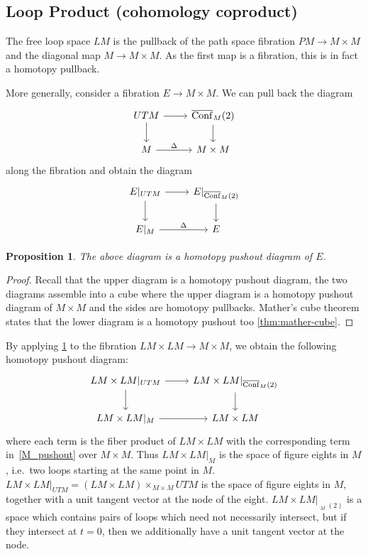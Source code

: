 \documentclass{scrartcl}
\theoremstyle{plain}
\newtheorem{proposition}[theorem]{Proposition}
\theoremstyle{definition}
\DeclareMathOperator{\cConf}{\overline{Conf}}
\begin{document}
\subsection{Loop Product (cohomology coproduct)}\label{subsec:loop-product}
The free loop space $LM$ is the pullback of the path space fibration $PM \to M\times M$ and the diagonal map $M\to M\times M$. As the first map is a fibration, this is in fact a homotopy pullback. %

More generally, consider a fibration $E\to M\times M$. We can pull back the diagram 
\begin{equation}\label{M_pushout}
    \begin{tikzcd}
        UTM \dar\rar & \cConf_M(2)\dar \\
        M \rar["\Delta"] & M\times M
    \end{tikzcd}
\end{equation}
along the fibration and obtain the diagram
\begin{equation}\label{E_pushout}
    \begin{tikzcd}
        E|_{UTM} \dar\rar & E|_{\cConf_M(2)}\dar \\
        E|_M \rar["\Delta"] & E
    \end{tikzcd}
\end{equation}
\begin{proposition}\label{lem:pullback_cube}
    The above diagram is a homotopy pushout diagram of $E$. 
\end{proposition}
\begin{proof}
Recall that the upper diagram is a homotopy pushout diagram, the two diagrams assemble into a cube where the upper diagram is a homotopy pushout diagram of $M\times M$ and the sides are homotopy pullbacks. Mather's cube theorem states that the lower diagram is a homotopy pushout too \cref{thm:mather-cube}. 
\end{proof}

By applying \cref{lem:pullback_cube} to the fibration $LM\times LM\to M\times M$, we obtain the following homotopy pushout diagram:
\begin{equation}
    \begin{tikzcd}
        LM\times LM|_{UTM} \rar\dar & LM\times LM |_{\cConf_M(2)} \dar \\
        LM\times LM|_M \rar & LM\times LM
    \end{tikzcd}
\end{equation}
where each term is the fiber product of $LM\times LM$ with the corresponding term in~\ref{M_pushout} over $M\times M$. Thus $LM\times LM|_M$ is the space of figure eights in $M$, i.e.\ two loops starting at the same point in $M$. $LM\times LM|_{UTM} = (LM\times LM)\times_{M\times M} UTM$ is the space of figure eights in $M$, together with a unit tangent vector at the node of the eight. $LM\times LM|_{\cConf_M(2)}$ is a space which contains pairs of loops which need not necessarily intersect, but if they intersect at $t=0$, then we additionally have a unit tangent vector at the node. 
\end{document}
